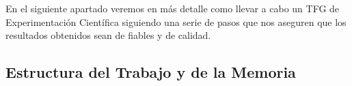 

   
En el siguiente apartado veremos en más detalle como llevar a cabo un TFG de Experimentación Científica siguiendo una serie de pasos que nos aseguren que los resultados obtenidos sean de fiables y de calidad.

\subsection{Estructura del Trabajo y de la Memoria}\label{tfx_inv_s_est_trabajo_memoria}

